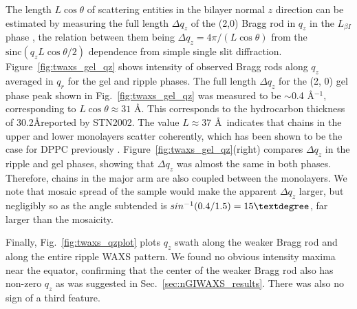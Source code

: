 The length $L\cos\theta$ of scattering entities in the bilayer normal $z$ direction can be estimated by 
measuring the full length $\Delta q_z$ of the (2,0) Bragg rod in $q_z$ in
the $L_{\beta I}$ phase \cite{ref:Tristram93},
the relation between them being $\Delta q_z = 4\pi/(L\cos\theta)$ 
from the $\textrm{sinc}(q_zL\cos\theta/2)$ dependence from simple single slit 
diffraction. 
Figure~\ref{fig:twaxs_gel_qz} shows intensity of observed Bragg rods along $q_z$ averaged in $q_r$
for the gel and ripple phases. The full length $\Delta q_z$ for the (2, 0) gel
phase peak shown in Fig.~\ref{fig:twaxs_gel_qz} was measured to be 
$\sim$0.4 \AA$^{-1}$, corresponding to 
$L\cos\theta \approx 31$ \AA. 
{\jn This corresponds to the hydrocarbon thickness of 30.2\AA  reported by 
STN2002}. 
The value $L \approx 37$ \AA\ indicates that chains in the upper and
lower monolayers scatter coherently, which has been shown to be the case
for DPPC previously \cite{ref:Tristram93}.
Figure~\ref{fig:twaxs_gel_qz}(right) compares $\Delta q_z$ in the ripple and gel phases,
showing that $\Delta q_z$ was almost the same in both phases. Therefore, 
chains in the major arm are also coupled between the monolayers. 
{\jn We note that mosaic spread of the sample would make the apparent $\Delta q_z$ 
larger, but negligibly so as the angle subtended is $sin^{-1}(0.4/1.5)=15\textdegree$, far larger than the
mosaicity.} 

Finally, Fig.~\ref{fig:twaxs_qzplot} plots $q_z$ swath along the weaker 
Bragg rod and along the entire ripple WAXS pattern. 
We found no obvious intensity maxima
near the equator, confirming that the center of the weaker Bragg rod also 
has non-zero $q_z$ as was suggested in Sec.~\ref{sec:nGIWAXS_results}.
There was also no sign of a third feature.

